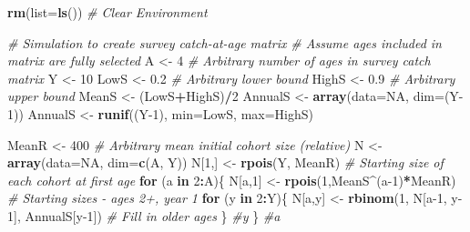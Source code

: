 \documentclass[
]{krantz}
\makeatletter
\newenvironment{Shaded}{\begin{snugshade}}{\end{snugshade}}
\newcommand{\AttributeTok}[1]{\textcolor[rgb]{0.27,0.27,0.27}{#1}}
\newcommand{\CommentTok}[1]{\textcolor[rgb]{0.37,0.37,0.37}{\textit{#1}}}
\newcommand{\ConstantTok}[1]{\textcolor[rgb]{0.37,0.37,0.37}{#1}}
\newcommand{\ControlFlowTok}[1]{\textcolor[rgb]{0.27,0.27,0.27}{\textbf{#1}}}
\newcommand{\DecValTok}[1]{\textcolor[rgb]{0.06,0.06,0.06}{#1}}
\newcommand{\FloatTok}[1]{\textcolor[rgb]{0.06,0.06,0.06}{#1}}
\newcommand{\FunctionTok}[1]{\textcolor[rgb]{0.27,0.27,0.27}{\textbf{#1}}}
\newcommand{\NormalTok}[1]{#1}
\newcommand{\OtherTok}[1]{\textcolor[rgb]{0.37,0.37,0.37}{#1}}
\newcommand{\SpecialCharTok}[1]{\textcolor[rgb]{0.43,0.43,0.43}{\textbf{#1}}}
\newenvironment{kframe}{%
\medskip{}
\setlength{\fboxsep}{.8em}
 \def\at@end@of@kframe{}%
 \ifinner\ifhmode%
  \def\at@end@of@kframe{\end{minipage}}%
  \begin{minipage}{\columnwidth}%
 \fi\fi%
 \def\FrameCommand##1{\hskip\@totalleftmargin \hskip-\fboxsep
 \colorbox{shadecolor}{##1}\hskip-\fboxsep
     \hskip-\linewidth \hskip-\@totalleftmargin \hskip\columnwidth}%
 \MakeFramed {\advance\hsize-\width
   \@totalleftmargin\z@ \linewidth\hsize
   \@setminipage}}%
 {\par\unskip\endMakeFramed%
 \at@end@of@kframe}
\renewenvironment{Shaded}{\begin{kframe}}{\end{kframe}}
\makeatother
\begin{document}
\begin{Shaded}
\begin{Highlighting}[]
\FunctionTok{rm}\NormalTok{(}\AttributeTok{list=}\FunctionTok{ls}\NormalTok{()) }\CommentTok{\# Clear Environment}

\CommentTok{\# Simulation to create survey catch{-}at{-}age matrix}
\CommentTok{\# Assume ages included in matrix are fully selected}
\NormalTok{A }\OtherTok{\textless{}{-}} \DecValTok{4} \CommentTok{\# Arbitrary number of ages in survey catch matrix}
\NormalTok{Y }\OtherTok{\textless{}{-}} \DecValTok{10}
\NormalTok{LowS }\OtherTok{\textless{}{-}} \FloatTok{0.2} \CommentTok{\# Arbitrary lower bound}
\NormalTok{HighS }\OtherTok{\textless{}{-}} \FloatTok{0.9} \CommentTok{\# Arbitrary upper bound}
\NormalTok{MeanS }\OtherTok{\textless{}{-}}\NormalTok{ (LowS}\SpecialCharTok{+}\NormalTok{HighS)}\SpecialCharTok{/}\DecValTok{2}
\NormalTok{AnnualS }\OtherTok{\textless{}{-}} \FunctionTok{array}\NormalTok{(}\AttributeTok{data=}\ConstantTok{NA}\NormalTok{, }\AttributeTok{dim=}\NormalTok{(Y}\DecValTok{{-}1}\NormalTok{))}
\NormalTok{AnnualS }\OtherTok{\textless{}{-}} \FunctionTok{runif}\NormalTok{((Y}\DecValTok{{-}1}\NormalTok{), }\AttributeTok{min=}\NormalTok{LowS, }\AttributeTok{max=}\NormalTok{HighS)}

\NormalTok{MeanR }\OtherTok{\textless{}{-}} \DecValTok{400} \CommentTok{\# Arbitrary mean initial cohort size (relative)}
\NormalTok{N }\OtherTok{\textless{}{-}} \FunctionTok{array}\NormalTok{(}\AttributeTok{data=}\ConstantTok{NA}\NormalTok{, }\AttributeTok{dim=}\FunctionTok{c}\NormalTok{(A, Y))}
\NormalTok{N[}\DecValTok{1}\NormalTok{,] }\OtherTok{\textless{}{-}} \FunctionTok{rpois}\NormalTok{(Y, MeanR) }\CommentTok{\# Starting size of each cohort at first age}
\ControlFlowTok{for}\NormalTok{ (a }\ControlFlowTok{in} \DecValTok{2}\SpecialCharTok{:}\NormalTok{A)\{}
\NormalTok{  N[a,}\DecValTok{1}\NormalTok{] }\OtherTok{\textless{}{-}} \FunctionTok{rpois}\NormalTok{(}\DecValTok{1}\NormalTok{,MeanS}\SpecialCharTok{\^{}}\NormalTok{(a}\DecValTok{{-}1}\NormalTok{)}\SpecialCharTok{*}\NormalTok{MeanR) }\CommentTok{\# Starting sizes {-} ages 2+, year 1}
  \ControlFlowTok{for}\NormalTok{ (y }\ControlFlowTok{in} \DecValTok{2}\SpecialCharTok{:}\NormalTok{Y)\{}
\NormalTok{    N[a,y] }\OtherTok{\textless{}{-}} \FunctionTok{rbinom}\NormalTok{(}\DecValTok{1}\NormalTok{, N[a}\DecValTok{{-}1}\NormalTok{, y}\DecValTok{{-}1}\NormalTok{], AnnualS[y}\DecValTok{{-}1}\NormalTok{]) }\CommentTok{\# Fill in older ages}
\NormalTok{    \} }\CommentTok{\#y}
\NormalTok{  \} }\CommentTok{\#a}


\end{Highlighting}
\end{Shaded}
\end{document}
